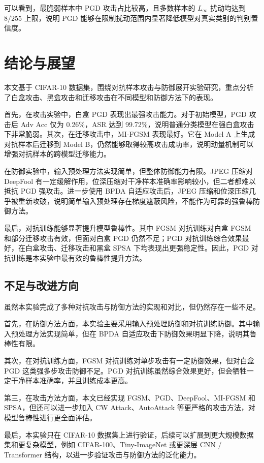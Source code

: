 \documentclass[UTF8,a4paper,12pt]{ctexart}
\begin{document}
可以看到，最脆弱样本中 PGD 攻击占比较高，且多数样本的 $L_\infty$ 扰动均达到 $8/255$ 上限，说明 PGD 能够在限制扰动范围内显著降低模型对真实类别的判别置信度。

\section{结论与展望}

本文基于 CIFAR-10 数据集，围绕对抗样本攻击与防御展开实验研究，重点分析了白盒攻击、黑盒攻击和迁移攻击在不同模型和防御方法下的表现。

首先，在攻击实验中，白盒 PGD 表现出最强攻击能力。对于初始模型，PGD 攻击后 Adv Acc 仅为 0.26\%，ASR 达到 99.72\%，说明普通分类模型在强白盒攻击下非常脆弱。其次，在迁移攻击中，MI-FGSM 表现最好。它在 Model A 上生成对抗样本后迁移到 Model B，仍然能够取得较高攻击成功率，说明动量机制可以增强对抗样本的跨模型迁移能力。

在防御实验中，输入预处理方法实现简单，但整体防御能力有限。JPEG 压缩对 DeepFool 有一定缓解作用，位深压缩对干净样本准确率影响较小，但二者都难以抵抗 PGD 强攻击。进一步使用 BPDA 自适应攻击后，JPEG 压缩和位深压缩几乎被重新攻破，说明简单输入预处理存在梯度遮蔽风险，不能作为可靠的强鲁棒防御方法。

最后，对抗训练能够显著提升模型鲁棒性。其中 FGSM 对抗训练对白盒 FGSM 和部分迁移攻击有效，但面对白盒 PGD 仍然不足；PGD 对抗训练综合效果最好，在白盒攻击、迁移攻击和黑盒 SPSA 下均表现出更强稳定性。因此，PGD 对抗训练是本实验中最有效的鲁棒性提升方法。

\subsection{不足与改进方向}

虽然本实验完成了多种对抗攻击与防御方法的实现和对比，但仍然存在一些不足。

首先，在防御方法方面，本实验主要采用输入预处理防御和对抗训练防御。其中输入预处理方法实现简单，但在 BPDA 自适应攻击下防御效果明显下降，说明其鲁棒性有限。

其次，在对抗训练方面，FGSM 对抗训练对单步攻击有一定防御效果，但对白盒 PGD 这类强多步攻击防御不足。PGD 对抗训练虽然综合效果更好，但会牺牲一定干净样本准确率，并且训练成本更高。

第三，在攻击方法方面，本文已经实现 FGSM、PGD、DeepFool、MI-FGSM 和 SPSA，但还可以进一步加入 CW Attack、AutoAttack 等更严格的攻击方法，对模型鲁棒性进行更全面评估。

最后，本实验只在 CIFAR-10 数据集上进行验证，后续可以扩展到更大规模数据集和更复杂模型，例如 CIFAR-100、Tiny-ImageNet 或更深层 CNN / Transformer 结构，以进一步验证攻击与防御方法的泛化能力。
\end{document}
